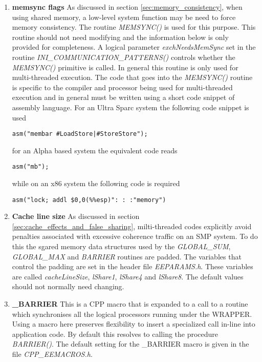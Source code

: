 \begin{enumerate}
\item {\bf memsync flags}
As discussed in section \ref{sec:memory_consistency}, when using shared memory,
a low-level system function may be need to force memory consistency.
The routine {\em MEMSYNC()} is used for this purpose. This routine should
not need modifying and the information below is only provided for
completeness. A logical parameter {\em exchNeedsMemSync} set
in the routine {\em INI\_COMMUNICATION\_PATTERNS()} controls whether
the {\em MEMSYNC()} primitive is called. In general this
routine is only used for multi-threaded execution.
The code that goes into the {\em MEMSYNC()}
 routine is specific to the compiler and
processor being used for multi-threaded execution and in general
must be written using a short code snippet of assembly language.
For an Ultra Sparc system the following code snippet is used
\begin{verbatim}
asm("membar #LoadStore|#StoreStore");
\end{verbatim}
for an Alpha based system the equivalent code reads
\begin{verbatim}
asm("mb");
\end{verbatim}
while on an x86 system the following code is required
\begin{verbatim}
asm("lock; addl $0,0(%%esp)": : :"memory")
\end{verbatim}

\item {\bf Cache line size}
As discussed in section \ref{sec:cache_effects_and_false_sharing},
milti-threaded codes explicitly avoid penalties associated with excessive 
coherence traffic on an SMP system. To do this the sgared memory data structures
used by the {\em GLOBAL\_SUM}, {\em GLOBAL\_MAX} and {\em BARRIER} routines
are padded. The variables that control the padding are set in the
header file {\em EEPARAMS.h}. These variables are called
{\em cacheLineSize}, {\em lShare1}, {\em lShare4} and
{\em lShare8}. The default values should not normally need changing.
\item {\bf \_BARRIER}
This is a CPP macro that is expanded to a call to a routine
which synchronises all the logical processors running under the
WRAPPER. Using a macro here preserves flexibility to insert
a specialized call in-line into application code. By default this
resolves to calling the procedure {\em BARRIER()}. The default
setting for the \_BARRIER macro is given in the file {\em CPP\_EEMACROS.h}.


\end{enumerate}
